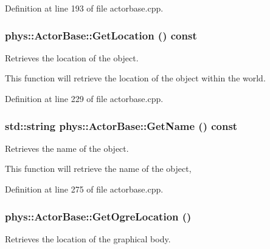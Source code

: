 Definition at line 193 of file actorbase.cpp.

\hypertarget{classphys_1_1ActorBase_a777b4ea4d6881af76c646b1ba9324d96}{
\subsubsection[{GetLocation}]{ phys::ActorBase::GetLocation () const}}
\label{d8/d0f/classphys_1_1ActorBase_a777b4ea4d6881af76c646b1ba9324d96}


Retrieves the location of the object. 

This function will retrieve the location of the object within the world. 

Definition at line 229 of file actorbase.cpp.

\hypertarget{classphys_1_1ActorBase_afc1851d7445c98a9389b3902a214a5e1}{
\subsubsection[{GetName}]{\setlength{\rightskip}{0pt plus 5cm}std::string phys::ActorBase::GetName () const}}
\label{d8/d0f/classphys_1_1ActorBase_afc1851d7445c98a9389b3902a214a5e1}


Retrieves the name of the object. 

This function will retrieve the name of the object, 

Definition at line 275 of file actorbase.cpp.

\hypertarget{classphys_1_1ActorBase_a89642f74b0f2782f5f3bf1bed080939e}{
\subsubsection[{GetOgreLocation}]{ phys::ActorBase::GetOgreLocation ()}}
\label{d8/d0f/classphys_1_1ActorBase_a89642f74b0f2782f5f3bf1bed080939e}


Retrieves the location of the graphical body. 

